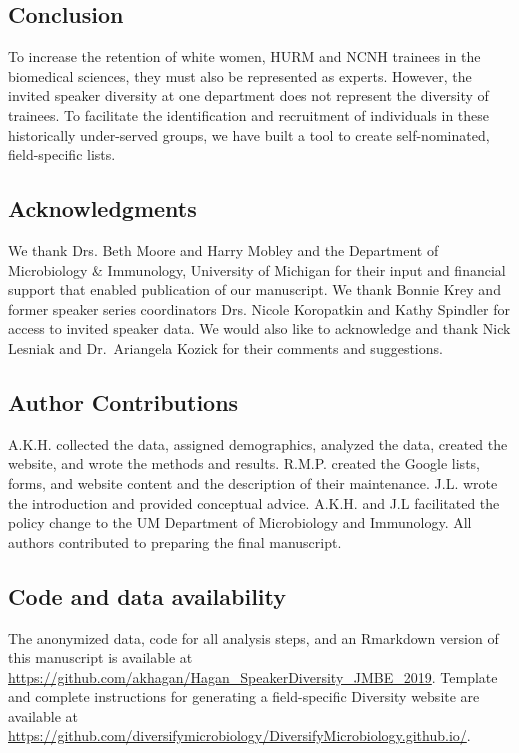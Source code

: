 \documentclass[10pt,]{article}
\begin{document}
\subsection{Conclusion}\label{conclusion}

To increase the retention of white women, HURM and NCNH trainees in the
biomedical sciences, they must also be represented as experts. However,
the invited speaker diversity at one department does not represent the
diversity of trainees. To facilitate the identification and recruitment
of individuals in these historically under-served groups, we have built
a tool to create self-nominated, field-specific lists.

\subsection{Acknowledgments}\label{acknowledgments}

We thank Drs. Beth Moore and Harry Mobley and the Department of
Microbiology \& Immunology, University of Michigan for their input and
financial support that enabled publication of our manuscript. We thank
Bonnie Krey and former speaker series coordinators Drs. Nicole
Koropatkin and Kathy Spindler for access to invited speaker data. We
would also like to acknowledge and thank Nick Lesniak and Dr.~Ariangela
Kozick for their comments and suggestions.

\subsection{Author Contributions}\label{author-contributions}

A.K.H. collected the data, assigned demographics, analyzed the data,
created the website, and wrote the methods and results. R.M.P. created
the Google lists, forms, and website content and the description of
their maintenance. J.L. wrote the introduction and provided conceptual
advice. A.K.H. and J.L facilitated the policy change to the UM
Department of Microbiology and Immunology. All authors contributed to
preparing the final manuscript.

\subsection{Code and data
availability}\label{code-and-data-availability}

The anonymized data, code for all analysis steps, and an Rmarkdown
version of this manuscript is available at
\url{https://github.com/akhagan/Hagan_SpeakerDiversity_JMBE_2019}.
Template and complete instructions for generating a field-specific
Diversity website are available at
\url{https://github.com/diversifymicrobiology/DiversifyMicrobiology.github.io/}.
\end{document}

